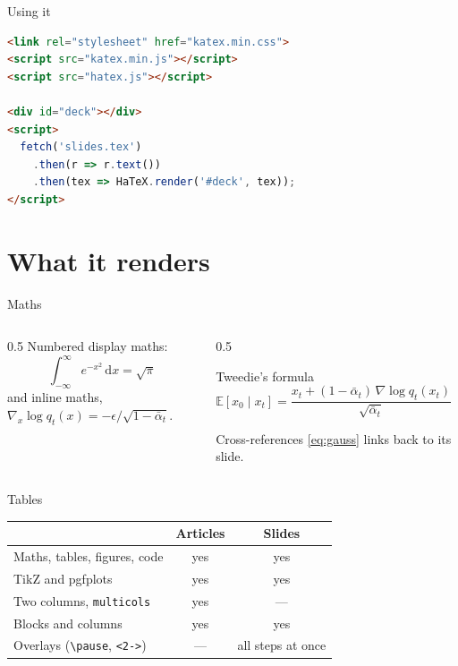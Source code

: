 \documentclass[aspectratio=169]{beamer}
\begin{document}
\begin{frame}[fragile]{Using it}
\begin{lstlisting}[language=html]
<link rel="stylesheet" href="katex.min.css">
<script src="katex.min.js"></script>
<script src="hatex.js"></script>

<div id="deck"></div>
<script>
  fetch('slides.tex')
    .then(r => r.text())
    .then(tex => HaTeX.render('#deck', tex));
</script>
\end{lstlisting}
\end{frame}

\section{What it renders}
\begin{frame}[t]{Maths}
  \begin{columns}[T]
    \begin{column}{0.5\textwidth}
      Numbered display maths:
      \begin{equation}\label{eq:gauss}
        \int_{-\infty}^{\infty} e^{-x^2}\,\mathrm{d}x = \sqrt{\pi}
      \end{equation}
      and inline maths, $\nabla_x \log q_t(x) = -\epsilon / \sqrt{1-\bar\alpha_t}$.
    \end{column}
    \begin{column}{0.5\textwidth}
      \begin{block}{Tweedie's formula}
        $\mathbb{E}[x_0 \mid x_t] = \dfrac{x_t + (1-\bar\alpha_t)\,\nabla \log q_t(x_t)}{\sqrt{\bar\alpha_t}}$
      \end{block}
      \begin{alertblock}{Cross-references}
        \eqref{eq:gauss} links back to its slide.
      \end{alertblock}
    \end{column}
  \end{columns}
\end{frame}

\begin{frame}{Tables}
  \begin{center}
    \begin{tabular}{lcc}
      \toprule
      & Articles & Slides \\
      \midrule
      Maths, tables, figures, code & yes & yes \\
      TikZ and pgfplots & yes & yes \\
      Two columns, \texttt{multicols} & yes & --- \\
      Blocks and columns & yes & yes \\
      Overlays (\verb|\pause|, \verb|<2->|) & --- & all steps at once \\
      \bottomrule
    \end{tabular}
  \end{center}
\end{frame}
\end{document}

